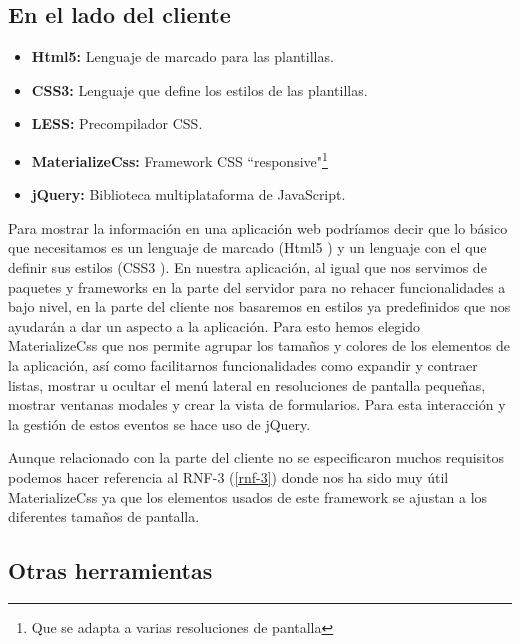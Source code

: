 \subsection{En el lado del cliente}

\begin{itemize}
  \item \textbf{Html5:} Lenguaje de marcado para las plantillas. 
  \item \textbf{CSS3:} Lenguaje que define los estilos de las plantillas.
  \item \textbf{LESS:} Precompilador CSS.
  \item \textbf{MaterializeCss:} Framework CSS ``responsive"\footnote{Que se adapta a varias resoluciones de pantalla}
  \item \textbf{jQuery:} Biblioteca multiplataforma de JavaScript.
\end{itemize}


\bigskip
Para mostrar la información en una aplicación web podríamos decir que lo básico que necesitamos es un lenguaje de marcado (Html5 \cite{html5}) y un lenguaje con el que definir sus estilos (CSS3 \cite{css3}). En nuestra aplicación, al igual que nos servimos de paquetes y frameworks en la parte del servidor para no rehacer funcionalidades a bajo nivel, en la parte del cliente nos basaremos en estilos ya predefinidos que nos ayudarán a dar un aspecto a la aplicación. Para esto hemos elegido MaterializeCss que nos permite agrupar los tamaños y colores de los elementos de la aplicación, así como facilitarnos funcionalidades como expandir y contraer listas, mostrar u ocultar el menú lateral en resoluciones de pantalla pequeñas, mostrar ventanas modales y crear la vista de formularios. Para esta interacción y la gestión de estos eventos se hace uso de jQuery.


\bigskip
Aunque relacionado con la parte del cliente no se especificaron muchos requisitos podemos hacer referencia al RNF-3 (\ref{rnf-3}) donde nos ha sido muy útil MaterializeCss ya que los elementos usados de este framework se ajustan a los diferentes tamaños de pantalla.



\subsection{Otras herramientas}

